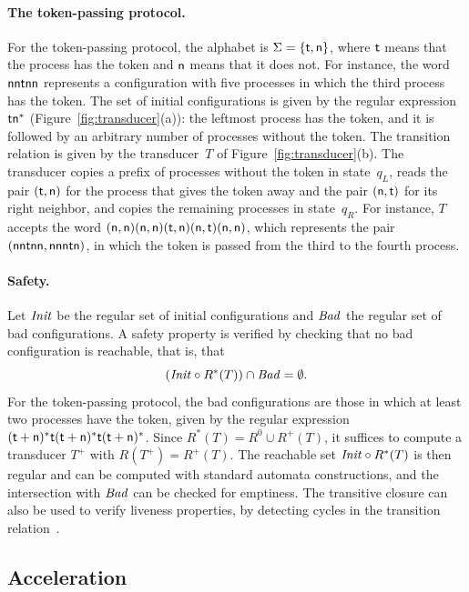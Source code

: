\paragraph{The token-passing protocol.}
For the token-passing protocol, the alphabet is $\Sigma = \{\mathsf{t}, \mathsf{n}\}$,
where $\mathsf{t}$ means that the process has the token and $\mathsf{n}$ means that it
does not. For instance, the word $\mathsf{n}\mathsf{n}\mathsf{t}\mathsf{n}\mathsf{n}$ represents a
configuration with five processes in which the third process has the token.
The set of initial configurations is given by the regular expression
$\mathsf{t}\mathsf{n}^*$ (Figure~\ref{fig:transducer}(a)): the leftmost process has the
token, and it is followed by an arbitrary number of processes without the
token. The transition relation is given by the transducer~$T$ of
Figure~\ref{fig:transducer}(b). The transducer copies a prefix of processes
without the token in state~$q_L$, reads the pair $(\mathsf{t},\mathsf{n})$ for the
process that gives the token away and the pair $(\mathsf{n},\mathsf{t})$ for its right
neighbor, and copies the remaining processes in state~$q_R$. For instance,
$T$ accepts the word $(\mathsf{n},\mathsf{n})(\mathsf{n},\mathsf{n})(\mathsf{t},\mathsf{n})
(\mathsf{n},\mathsf{t})(\mathsf{n},\mathsf{n})$, which represents the pair
$(\mathsf{n}\mathsf{n}\mathsf{t}\mathsf{n}\mathsf{n}, \mathsf{n}\mathsf{n}\mathsf{n}\mathsf{t}\mathsf{n})$, in which the
token is passed from the third to the fourth process.

\paragraph{Safety.}
Let $\mathit{Init}$ be the regular set of initial configurations and $\mathit{Bad}$ the regular
set of bad configurations. A safety property is verified by checking that no
bad configuration is reachable, that is, that
\[
(\mathit{Init} \circ R^*(T)) \cap \mathit{Bad} = \emptyset .
\]
For the token-passing protocol, the bad configurations are those in which at
least two processes have the token, given by the regular expression $(\mathsf{t} +
\mathsf{n})^* \mathsf{t} (\mathsf{t} + \mathsf{n})^* \mathsf{t} (\mathsf{t} + \mathsf{n})^*$. Since $R^*(T) = R^0
\cup R^+(T)$, it suffices to compute a transducer $T^+$ with $R(T^+) =
R^+(T)$. The reachable set $\mathit{Init} \circ R^*(T)$ is then regular and can be
computed with standard automata constructions, and the intersection with
$\mathit{Bad}$ can be checked for emptiness. The transitive closure can also be used to
verify liveness properties, by detecting cycles in the transition
relation~\cite{AJNOS04}.

\subsection{Acceleration}
\label{sec:acceleration}

